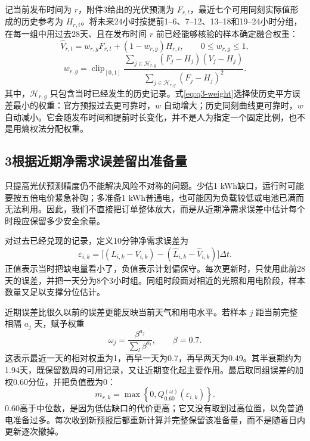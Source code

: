 \documentclass[11pt,a4paper]{article}
\begin{document}
记当前发布时间为 $r$，附件3给出的光伏预测为 $F_{r,t}$，最近七个可用同刻实际值形成的历史参考为 $H_{r,t}$。将未来24小时按提前1--6、7--12、13--18和19--24小时分组，在每一组中用过去28天、且在发布时间 $r$ 前已经能够核验的样本确定融合权重：
\begin{equation}
\widehat V_{r,t}=w_{r,g}F_{r,t}+(1-w_{r,g})H_{r,t},
\qquad 0\le w_{r,g}\le1,
\label{eq:q3-fusion}
\end{equation}
\begin{equation}
w_{r,g}=\operatorname{clip}_{[0,1]}
\frac{\sum_{j\in\mathcal H_{r,g}}(F_j-H_j)(V_j-H_j)}
{\sum_{j\in\mathcal H_{r,g}}(F_j-H_j)^2}.
\label{eq:q3-weight}
\end{equation}
其中，$\mathcal H_{r,g}$ 只包含当时已经发生的历史记录。式\eqref{eq:q3-weight}选择使历史平方误差最小的权重：官方预报过去更可靠时，$w$ 自动增大；历史同刻曲线更可靠时，$w$ 自动减小。它会随发布时间和提前时长变化，并不是人为指定一个固定比例，也不是用熵权法分配权重。

\subsection*{3\quad 根据近期净需求误差留出准备量}

只提高光伏预测精度仍不能解决风险不对称的问题。少估1 kWh缺口，运行时可能要按五倍电价紧急补购；多准备1 kWh普通电，也可能因为负载较低或电池已满而无法利用。因此，我们不直接把订单整体放大，而是从近期净需求误差中估计每个时段应保留多少安全余量。

对过去已经兑现的记录，定义10分钟净需求误差为
\begin{equation}
\varepsilon_{i,k}=
\big[(L_{i,k}-V_{i,k})-(\widehat L_{i,k}-\widehat V_{i,k})\big]\Delta t.
\label{eq:q3-error}
\end{equation}
正值表示当时把缺电量看小了，负值表示计划偏保守。每次更新时，只使用此前28天的误差，并把一天分为8个3小时组。同组时段面对相近的光照和用电阶段，样本数量又足以支撑分位估计。

近期误差比很久以前的误差更能反映当前天气和用电水平。若样本 $j$ 距当前完整相隔 $a_j$ 天，赋予权重
\begin{equation}
\omega_j=\frac{\beta^{a_j}}{\sum_l\beta^{a_l}},\qquad \beta=0.7.
\label{eq:q3-decay}
\end{equation}
这表示最近一天的相对权重为1，再早一天为0.7，再早两天为0.49。其半衰期约为1.94天，既保留数周的可用记录，又让近期变化起主要作用。最后取同组误差的加权0.60分位，并把负值截为0：
\begin{equation}
m_{r,k}=\max\left\{0,Q_{0.60}^{(\omega)}(\varepsilon_{i,k})\right\}.
\label{eq:q3-margin}
\end{equation}
0.60高于中位数，是因为低估缺口的代价更高；它又没有取到过高位置，以免普通电准备过多。每次收到新预报后都重新计算并完整保留该准备量，而不是随着日内更新逐次撤掉。
\end{document}
